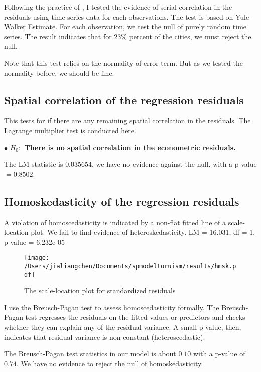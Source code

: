 \documentclass[11pt,a4paper]{amsart}
\theoremstyle{plain}
\theoremstyle{definition}
\begin{document}
Following the practice of \parencite{elhorstEvidencePoliticalYardstick2009a}, I tested the evidence of serial correlation in the residuals using time series data for each observations. The test is based on Yule-Walker Estimate. For each observation, we test the null of purely random time series. The result indicates that for $23\%$ percent of the cities, we must reject the null. 

Note that this test relies on the normality of error term. But as we tested the normality before, we should be fine. 

\subsection{Spatial correlation of the regression residuals}\hfill\par

This tests for if there are any remaining spatial correlation in the residuals. The Lagrange multiplier test is conducted here.

$\bullet$ \textbf{$H_{0}:$ There is no spatial correlation in the econometric residuals.} 

The LM statistic is $0.035654$, we have no evidence against the null, with a p-value $= 0.8502$. 

\subsection{Homoskedasticity of the regression residuals}\hfill\par
A violation of homoscedasticity is indicated by a non-flat fitted line of a scale-location plot.  We fail to find evidence of heteroskedasticity. LM = 16.031, df = 1, p-value = 6.232e-05

\begin{figure}[hbt]
	{\centering \texttt{[image: /Users/jialiangchen/Documents/spmodeltoruism/results/hmsk.pdf]}}
	\caption{The scale-location plot for standardized residuals}\label{F:hmsk}
\end{figure}

I use the Breusch-Pagan test to assess homoscedasticity formally. The Breusch-Pagan test regresses the residuals on the fitted values or predictors and checks whether they can explain any of the residual variance. A small p-value, then, indicates that residual variance is non-constant (heteroscedastic). 

The Breusch-Pagan test statistics in our model is about $0.10$ with a p-value of $0.74$. We have no evidence to reject the null of homoskedasticity.
\end{document}
